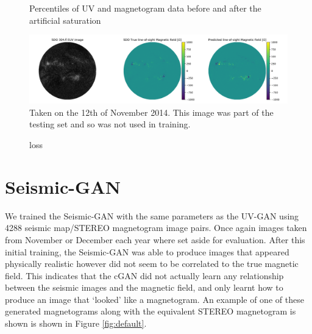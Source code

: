 \documentclass[11pt,a4paper,onecolumn]{report}
\begin{document}
\begin{figure}
  \centering
  
  \caption{Percentiles of UV and magnetogram data before and after the artificial saturation}
  \label{fig:artificial_sat}
\end{figure}



\begin{figure}[t]%
  \includegraphics[width=\linewidth]{aia_hmi_mag.png}
  \caption[]{Taken on the 12th of November 2014. This image was part of the
  testing set and so was not used in training.}
  \label{fig:aia_hmi_mag}
\end{figure}

\begin{figure}[t]
  \centering
  
  \caption{%
  }
  \label{fig:stereo_mag}
\end{figure}

\begin{figure}[htbp]
  \centering
  
  \caption{loss}
  \label{fig:uv_loss}
\end{figure}

\section{Seismic-GAN}
\label{sec:train_seismic}

We trained the Seismic-GAN with the same parameters as the UV-GAN using 4288
seismic map/STEREO magnetogram image pairs. Once again images taken from
November or December each year where set aside for evaluation. After this
initial training, the Seismic-GAN was able to produce images that appeared
physically realistic however did not seem to be correlated to the true magnetic
field. This indicates that the cGAN did not actually learn any relationship
between the seismic images and the magnetic field, and only learnt how to
produce an image that `looked' like a magnetogram. An example of one of these
generated magnetograms along with the equivalent STEREO magnetogram is shown is
shown in Figure \ref{fig:default}. \\
\end{document}
